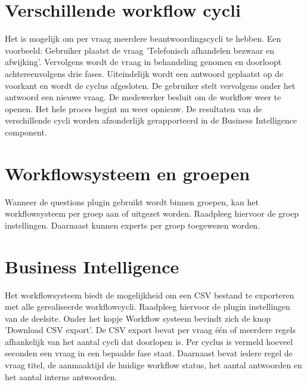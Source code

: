 \documentclass[12pt]{article}
\begin{document}
\section{Verschillende workflow cycli}
Het is mogelijk om per vraag meerdere beantwoordingscycli te hebben. Een voorbeeld: Gebruiker plaatst de vraag 'Telefonisch afhandelen bezwaar en afwijking'. Vervolgens wordt de vraag in behandeling genomen en doorloopt achtereenvolgens drie fases. Uiteindelijk wordt een antwoord geplaatst op de voorkant en wordt de cyclus afgesloten. De gebruiker stelt vervolgens onder het antwoord een nieuwe vraag. De medewerker besluit om de workflow weer te openen. Het hele proces begint nu weer opnieuw. De resultaten van de verschillende cycli worden afzonderlijk gerapporteerd in de Business Intelligence component.

\section{Workflowsysteem en groepen}
Wanneer de questions plugin gebruikt wordt binnen groepen, kan het workflowsysteem per groep aan of uitgezet worden. Raadpleeg hiervoor de groep instellingen. Daarnaast kunnen experts per groep toegewezen worden.

\section{Business Intelligence}
Het workflowsysteem biedt de mogelijkheid om een CSV bestand te exporteren met alle gerealiseerde workflowcycli. Raadpleeg hiervoor de plugin instellingen van de deelsite. Onder het kopje Workflow systeem bevindt zich de knop 'Download CSV export'.
De CSV export bevat per vraag één of meerdere regels afhankelijk van het aantal cycli dat doorlopen is. Per cyclus is vermeld hoeveel seconden een vraag in een bepaalde fase staat. Daarnaast bevat iedere regel de vraag titel, de aanmaaktijd de huidige workflow status, het aantal antwoorden en het aantal interne antwoorden.
\end{document}
